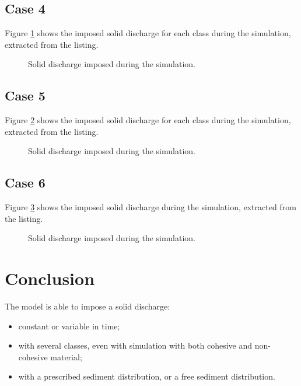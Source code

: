 \subsection{Case 4}
%
Figure \ref{flumebc:discharge4} shows the imposed solid discharge for each class
 during the simulation, extracted from the listing.
%
\begin{figure}[H]
 \centering
 \caption{Solid discharge imposed during the simulation.}
 \label{flumebc:discharge4}
\end{figure}
%
\subsection{Case 5}
%
Figure \ref{flumebc:discharge5} shows the imposed solid discharge for each class
 during the simulation, extracted from the listing.
%
\begin{figure}[H]
 \centering
 \caption{Solid discharge imposed during the simulation.}
 \label{flumebc:discharge5}
\end{figure}
%
\subsection{Case 6}
%
Figure \ref{flumebc:discharge6} shows the imposed solid discharge during the
simulation, extracted from the listing.
%
\begin{figure}[H]
 \centering
 \caption{Solid discharge imposed during the simulation.}
 \label{flumebc:discharge6}
\end{figure}
%
\section{Conclusion}
%
The model is able to impose a solid discharge:
\begin{itemize}
\item constant or variable in time;
\item with several classes, even with simulation with both cohesive and
non-cohesive material;
\item with a prescribed sediment distribution, or a free sediment distribution.
\end{itemize}
